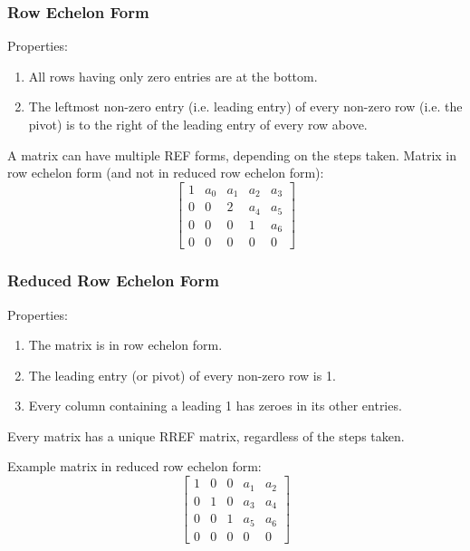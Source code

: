 \documentclass[../linear-algebra.tex]{subfiles}
\begin{document}
\subsubsection{Row Echelon Form}
Properties:
\begin{enumerate}
    \item All rows having only zero entries are at the bottom.
    \item The leftmost non-zero entry (i.e. leading entry) of every non-zero row (i.e. the pivot)
    is to the right of the leading entry of every row above.
\end{enumerate}
A matrix can have multiple REF forms, depending on the steps taken.
Matrix in row echelon form (and not in reduced row echelon form):
\[\begin{bmatrix}
    1 & a_0 & a_1 & a_2 & a_3 \\
    0 & 0   & 2   & a_4 & a_5 \\
    0 & 0   & 0   & 1   & a_6 \\
    0 & 0   & 0   & 0   & 0
\end{bmatrix}\]

\subsubsection{Reduced Row Echelon Form}
Properties:
\begin{enumerate}
    \item The matrix is in row echelon form.
    \item The leading entry (or pivot) of every non-zero row is 1.
    \item Every column containing a leading 1 has zeroes in its other entries.
\end{enumerate}
Every matrix has a unique RREF matrix, regardless of the steps taken.

\smallskip

\noindent Example matrix in reduced row echelon form:
\[\begin{bmatrix}
    1 & 0 & 0 & a_1 & a_2 \\
    0 & 1 & 0 & a_3 & a_4 \\
    0 & 0 & 1 & a_5 & a_6 \\
    0 & 0 & 0 & 0   & 0
\end{bmatrix}\]
\end{document}
